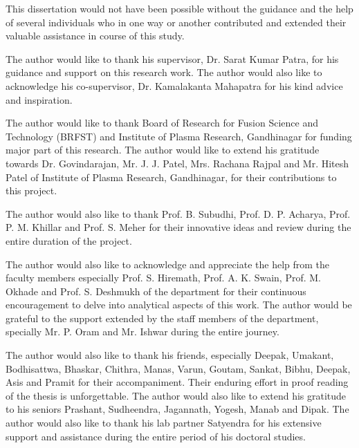 

\begin{acknowledgements}      %


This dissertation would not have been possible without the guidance and the help of several individuals who in one way or another contributed and extended their valuable assistance in course of this study.

\vspace{.5cm}
The author would like to thank his supervisor, Dr. Sarat Kumar Patra, for his guidance and support on this research work. The author would also like to acknowledge his co-supervisor, Dr. Kamalakanta Mahapatra for his kind advice and inspiration. 

\vspace{.5cm}
The author would like to thank Board of Research for Fusion Science and Technology (BRFST) and Institute of Plasma Research, Gandhinagar for funding major part of this research. The author would like to extend his gratitude towards Dr. Govindarajan, Mr. J. J. Patel, Mrs. Rachana Rajpal and Mr. Hitesh Patel of Institute of Plasma Research, Gandhinagar, for their contributions to this project. 

\vspace{.5cm}
The author would also like to thank Prof. B. Subudhi, Prof. D. P. Acharya, Prof. P. M. Khillar and Prof. S. Meher for their innovative ideas and review during the entire duration of the project. 

\vspace{.5cm}
The author would also like to acknowledge and appreciate the help from the faculty members especially Prof. S. Hiremath, Prof. A. K. Swain, Prof. M. Okhade and Prof. S. Deshmukh of the department for their continuous encouragement to delve into analytical aspects of this work. The author would be grateful to the support extended by the staff members of the department, specially Mr. P. Oram and Mr. Ishwar during the entire journey.

\vspace{.5cm}
The author would also like to thank his friends, especially Deepak, Umakant, Bodhisattwa, Bhaskar, Chithra, Manas, Varun, Goutam, Sankat, Bibhu, Deepak, Asis and Pramit for their accompaniment. Their enduring effort in proof reading of the thesis is unforgettable. The author would also like to extend his gratitude to his seniors Prashant, Sudheendra, Jagannath, Yogesh, Manab and Dipak. The author would also like to thank his lab partner Satyendra for his extensive support and assistance during the entire period of his doctoral studies.


\end{acknowledgements}
